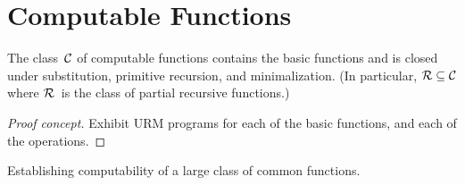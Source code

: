%
%
%
\section{Computable Functions}
\begin{thm}
The class~\(\mathcal{C}\) of computable functions contains the basic functions and is closed under substitution, primitive recursion, and minimalization. (In particular, \(\mathcal{R}\subseteq\mathcal{C}\) where \(\mathcal{R}\)~is the class of partial recursive functions.)
\end{thm}
\begin{proof}[Proof concept]
Exhibit URM programs for each of the basic functions, and each of the operations.
\end{proof}
\begin{app}
Establishing computability of a large class of common functions.
\end{app}
